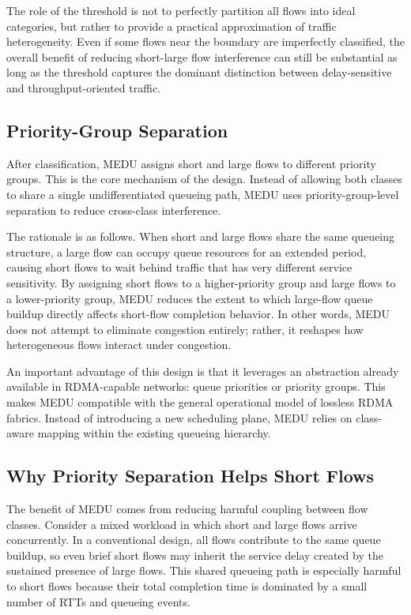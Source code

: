 \documentclass[conference]{IEEEtran}
\begin{document}
The role of the threshold is not to perfectly partition all flows into ideal categories, but rather to provide a practical approximation of traffic heterogeneity. Even if some flows near the boundary are imperfectly classified, the overall benefit of reducing short-large flow interference can still be substantial as long as the threshold captures the dominant distinction between delay-sensitive and throughput-oriented traffic.

\subsection{Priority-Group Separation}

After classification, MEDU assigns short and large flows to different priority groups. This is the core mechanism of the design. Instead of allowing both classes to share a single undifferentiated queueing path, MEDU uses priority-group-level separation to reduce cross-class interference.

The rationale is as follows. When short and large flows share the same queueing structure, a large flow can occupy queue resources for an extended period, causing short flows to wait behind traffic that has very different service sensitivity. By assigning short flows to a higher-priority group and large flows to a lower-priority group, MEDU reduces the extent to which large-flow queue buildup directly affects short-flow completion behavior. In other words, MEDU does not attempt to eliminate congestion entirely; rather, it reshapes how heterogeneous flows interact under congestion.

An important advantage of this design is that it leverages an abstraction already available in RDMA-capable networks: queue priorities or priority groups. This makes MEDU compatible with the general operational model of lossless RDMA fabrics. Instead of introducing a new scheduling plane, MEDU relies on class-aware mapping within the existing queueing hierarchy.

\subsection{Why Priority Separation Helps Short Flows}

The benefit of MEDU comes from reducing harmful coupling between flow classes. Consider a mixed workload in which short and large flows arrive concurrently. In a conventional design, all flows contribute to the same queue buildup, so even brief short flows may inherit the service delay created by the sustained presence of large flows. This shared queueing path is especially harmful to short flows because their total completion time is dominated by a small number of RTTs and queueing events.
\end{document}

